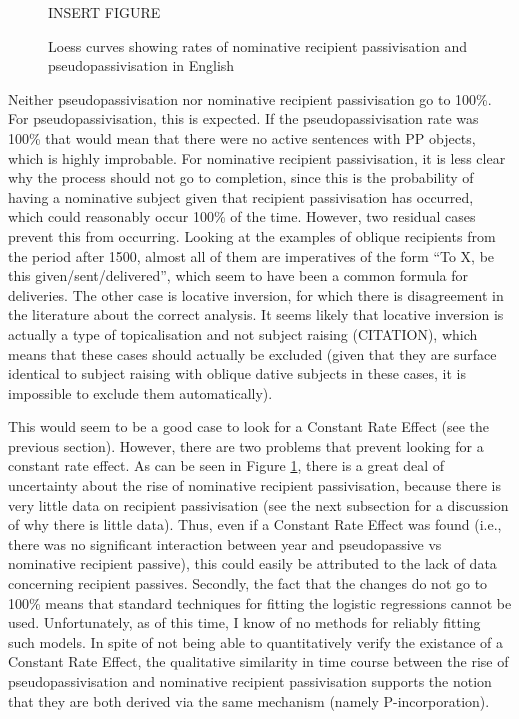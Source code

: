	\begin{figure}[ht!]
		INSERT FIGURE
		\caption{Loess curves showing rates of nominative recipient passivisation and pseudopassivisation in English}
		\label{fig:recpas-pseudo}
	\end{figure}

	Neither pseudopassivisation nor nominative recipient passivisation go to 100\%. For pseudopassivisation, this is expected. If the pseudopassivisation rate was 100\% that would mean that there were no active sentences with PP objects, which is highly improbable. For nominative recipient passivisation, it is less clear why the process should not go to completion, since this is the probability of having a nominative subject given that recipient passivisation has occurred, which could reasonably occur 100\% of the time. However, two residual cases prevent this from occurring. Looking at the examples of oblique recipients from the period after 1500, almost all of them are imperatives of the form ``To X, be this given/sent/delivered'', which seem to have been a common formula for deliveries. The other case is locative inversion, for which there is disagreement in the literature about the correct analysis. It seems likely that locative inversion is actually a type of topicalisation and not subject raising (CITATION), which means that these cases should actually be excluded (given that they are surface identical to subject raising with oblique dative subjects in these cases, it is impossible to exclude them automatically).

	This would seem to be a good case to look for a Constant Rate Effect (see the previous section). However, there are two problems that prevent looking for a constant rate effect. As can be seen in Figure \ref{fig:recpas-pseudo}, there is a great deal of uncertainty about the rise of nominative recipient passivisation, because there is very little data on recipient passivisation (see the next subsection for a discussion of why there is little data). Thus, even if a Constant Rate Effect was found (i.e., there was no significant interaction between year and pseudopassive vs nominative recipient passive), this could easily be attributed to the lack of data concerning recipient passives. Secondly, the fact that the changes do not go to 100\% means that standard techniques for fitting the logistic regressions cannot be used. Unfortunately, as of this time, I know of no methods for reliably fitting such models. In spite of not being able to quantitatively verify the existance of a Constant Rate Effect, the qualitative similarity in time course between the rise of pseudopassivisation and nominative recipient passivisation supports the notion that they are both derived via the same mechanism (namely P-incorporation).

